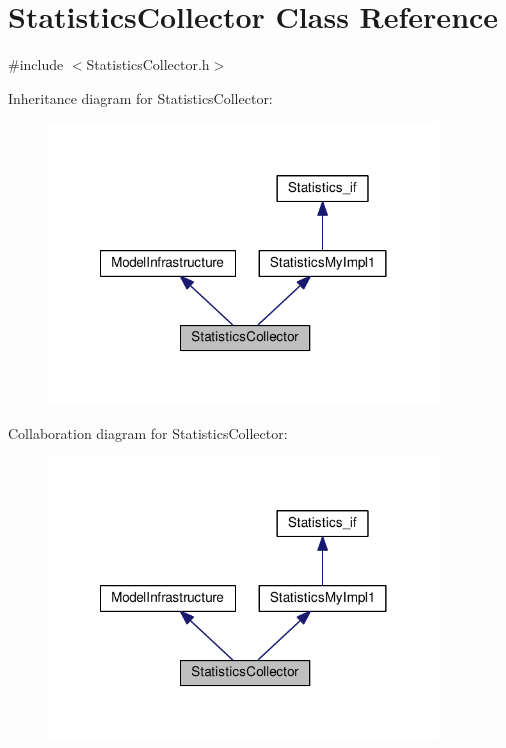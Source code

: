 \hypertarget{class_statistics_collector}{\section{Statistics\-Collector Class Reference}
\label{class_statistics_collector}
}


{\ttfamily \#include $<$Statistics\-Collector.\-h$>$}



Inheritance diagram for Statistics\-Collector\-:\nopagebreak
\begin{figure}[H]
\begin{center}
\leavevmode
\includegraphics[width=293pt]{class_statistics_collector__inherit__graph}
\end{center}
\end{figure}


Collaboration diagram for Statistics\-Collector\-:\nopagebreak
\begin{figure}[H]
\begin{center}
\leavevmode
\includegraphics[width=293pt]{class_statistics_collector__coll__graph}
\end{center}
\end{figure}

